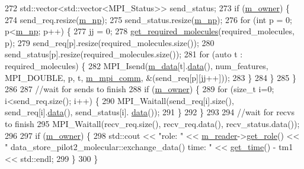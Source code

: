 \begin{DoxyCode}
272   std::vector<std::vector<MPI\_Status>> send\_status;
273   \textcolor{keywordflow}{if} (\hyperlink{classlbann_1_1data__store__pilot2__molecular_a9229deea455ef0a68508e6b956887dd3}{m\_owner}) \{
274     send\_req.resize(\hyperlink{classlbann_1_1generic__data__store_afcd4f99959c265c8c03dcf8ad3779d85}{m\_np});
275     send\_status.resize(\hyperlink{classlbann_1_1generic__data__store_afcd4f99959c265c8c03dcf8ad3779d85}{m\_np});
276     \textcolor{keywordflow}{for} (\textcolor{keywordtype}{int} p = 0; p<\hyperlink{classlbann_1_1generic__data__store_afcd4f99959c265c8c03dcf8ad3779d85}{m\_np}; p++) \{
277       jj = 0;
278       \hyperlink{classlbann_1_1data__store__pilot2__molecular_a7eadb63f1c879c62b587a7b5d972d4e4}{get\_required\_molecules}(required\_molecules, p);
279       send\_req[p].resize(required\_molecules.size());
280       send\_status[p].resize(required\_molecules.size());
281       \textcolor{keywordflow}{for} (\textcolor{keyword}{auto} t : required\_molecules) \{
282         MPI\_Isend(\hyperlink{classlbann_1_1data__store__pilot2__molecular_afbb012980857b9841deefb055905e6f5}{m\_data}[t].\hyperlink{namespacelbann_1_1cnpy__utils_a9ac86d96ccb1f8b4b2ea16441738781f}{data}(), num\_features, MPI\_DOUBLE, p, t, 
      \hyperlink{classlbann_1_1generic__data__store_ae2d2d61d5d766a7f525eedcb05e0dbf6}{m\_mpi\_comm}, &(send\_req[p][jj++]));
283       \}
284     \}
285   \}
286 
287   \textcolor{comment}{//wait for sends to finish}
288   \textcolor{keywordflow}{if} (\hyperlink{classlbann_1_1data__store__pilot2__molecular_a9229deea455ef0a68508e6b956887dd3}{m\_owner}) \{
289     \textcolor{keywordflow}{for} (\textcolor{keywordtype}{size\_t} i=0; i<send\_req.size(); i++) \{
290       MPI\_Waitall(send\_req[i].size(), send\_req[i].\hyperlink{namespacelbann_1_1cnpy__utils_a9ac86d96ccb1f8b4b2ea16441738781f}{data}(), send\_status[i].
      \hyperlink{namespacelbann_1_1cnpy__utils_a9ac86d96ccb1f8b4b2ea16441738781f}{data}());
291     \}
292   \}
293 
294   \textcolor{comment}{//wait for recvs to finish}
295   MPI\_Waitall(recv\_req.size(), recv\_req.data(), recv\_status.data());
296 
297   \textcolor{keywordflow}{if} (\hyperlink{classlbann_1_1data__store__pilot2__molecular_a9229deea455ef0a68508e6b956887dd3}{m\_owner}) \{
298     std::cout << \textcolor{stringliteral}{"role: "} << \hyperlink{classlbann_1_1generic__data__store_afa49ced0ab64c632371ea52532a91ec2}{m\_reader}->\hyperlink{classlbann_1_1generic__data__reader_a92982e1b399f37e2ead5aa440883cba5}{get\_role}() << \textcolor{stringliteral}{"
       data\_store\_pilot2\_molecular::exchange\_data() time: "} << \hyperlink{namespacelbann_a478d36031ff0659893c4322cd856157f}{get\_time}() - tm1 << std::endl;
299   \}
300 \}
\end{DoxyCode}
